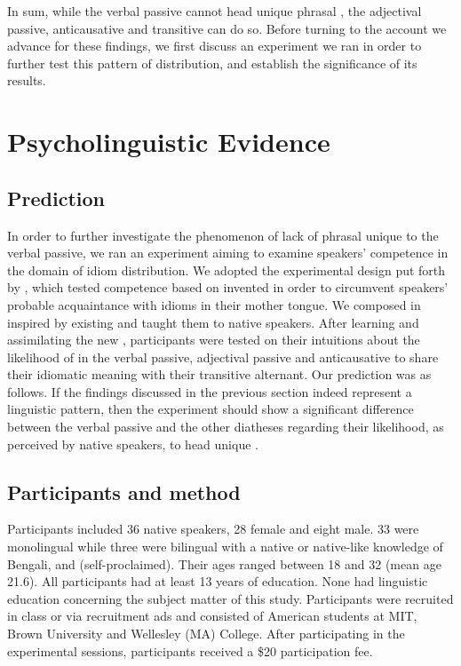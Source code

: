 \documentclass[output=paper]{langsci/langscibook}
\begin{document}
In sum, while the verbal passive cannot head unique phrasal , the
adjectival passive, anticausative and transitive can do so. Before turning to
the account we advance for these findings, we first discuss an experiment we
ran in order to further test this pattern of distribution, and establish the
significance of its results.

\section{Psycholinguistic Evidence}\label{sec:key:20.3}

\subsection{Prediction} %

In order to further investigate the phenomenon of lack of phrasal  unique
to the verbal passive, we ran an experiment aiming to examine speakers’
competence in the domain of idiom distribution. We adopted the experimental
design put forth by \textcite{SilHorKluWex2018}, which tested competence based
on invented  in order to circumvent speakers’ probable acquaintance with
idioms in their mother tongue. We composed  in  inspired by
existing   and taught them to native  speakers. After
learning and assimilating the new , participants were tested on their
intuitions about the likelihood of  in the verbal passive, adjectival
passive and anticausative to share their idiomatic meaning with their
transitive alternant. Our prediction was as follows. If the findings discussed
in the previous section indeed represent a linguistic pattern, then the
experiment should show a significant difference between the verbal passive and
the other diatheses regarding their likelihood, as perceived by native
speakers, to head unique .

\subsection{Participants and method} %

Participants included 36 native  speakers, 28 female and eight male.
33 were monolingual while three were bilingual with a native or native-like
knowledge of Bengali,  and  (self-proclaimed). Their
ages ranged be\-tween 18 and 32 (mean age 21.6).  All participants had at least
13 years of education.  None had linguistic education concerning the subject
matter of this study.  Participants were recruited in class or via recruitment
ads and consisted of American students at MIT, Brown University and Wellesley
(MA) College. After participating in the experimental sessions, participants
received a \$20 participation fee.
\end{document}
